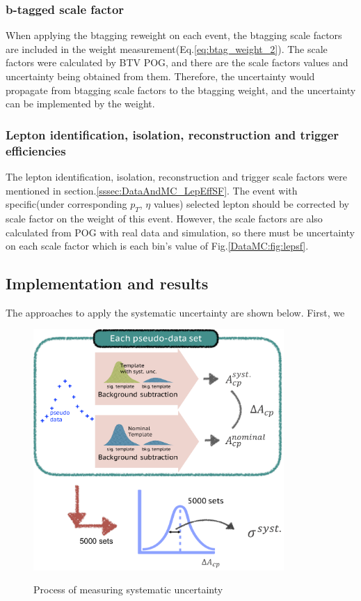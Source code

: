 		\subsubsection{b-tagged scale factor}
		\label{sssec:Syst_btag}

			When applying the btagging reweight on each event, the btagging scale factors are included in the weight measurement(Eq.\ref{eq:btag_weight_2}). The scale factors were calculated by BTV POG, and there are the scale factors values and uncertainty being obtained from them. Therefore, the uncertainty would propagate from btagging scale factors to the btagging weight, and the uncertainty can be implemented by the weight.

		\subsubsection{Lepton identification, isolation, reconstruction and trigger efficiencies}
		\label{sssec:Syst_lepsf}

			The lepton identification, isolation, reconstruction and trigger scale factors were mentioned in section.\ref{sssec:DataAndMC_LepEffSF}. The event with specific(under corresponding $p_T$, $\eta$ values) selected lepton should be corrected by scale factor on the weight of this event. However, the scale factors are also calculated from POG with real data and simulation, so there must be uncertainty on each scale factor which is each bin's value of Fig.\ref{DataMC:fig:lepsf}.

	\subsection{Implementation and results}
	\label{ssec:Syst_imp_result}

		The approaches to apply the systematic uncertainty are shown below. First, we 

		\begin{figure}[H]
		\centering{}
	    	\includegraphics[width=0.85\textwidth]{Figures/SystUnc/approach_syst.pdf}\\
		\caption{Process of measuring systematic uncertainty}
		\label{BkgEst:fig:Bkt_sub}
		\end{figure}
		\FloatBarrier


\FloatBarrier
